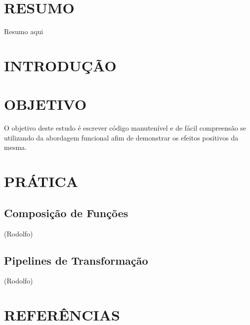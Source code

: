 \documentclass[date,twocolumn,a4paper]{ppgem}
\begin{document}
    \thispagestyle{plain}
    \makeheader
    \renewcommand{\listingscaption}{Código}


    \section*{RESUMO}
    Resumo aqui

    \section{INTRODUÇÃO}


    \section{OBJETIVO}
    O objetivo deste estudo é escrever código manutenível e de fácil compreensão se utilizando da abordagem funcional
    afim de demonstrar os efeitos positivos da mesma.

    

    
    
    \section{PRÁTICA}

    

    

    \subsection{Composição de Funções}
    (Rodolfo)
    \subsection{Pipelines de Transformação}
    (Rodolfo)
    
    \section{REFERÊNCIAS}\\
    
\end{document}
